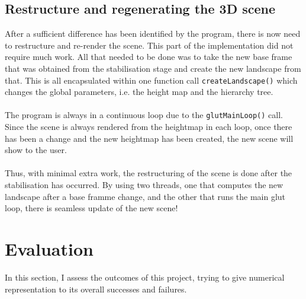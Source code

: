 \documentclass[11pt]{article}
\begin{document}
\subsection{Restructure and regenerating the 3D scene}
After a sufficient difference has been identified by the program, there is
now need to restructure and re-render the scene. This part of
the implementation did not require much work. All that needed to be done was
to take the new base frame that was obtained from the stabilisation
stage and create the new landscape from that. This is all encapsulated 
within one function call \texttt{createLandscape()} which changes
the global parameters, i.e. the height map and the hierarchy tree.\\
\\
The program is always in a continuous loop due to the \texttt{glutMainLoop()}
call. Since the scene is always rendered from the heightmap in each 
loop, once there has been a change and the new heightmap has been created,
the new scene will show to the user.\\
\\
Thus, with minimal extra work, the restructuring of the scene is done
after the stabilisation has occurred. By using two threads, one that
computes the new landscape after a base framme change, and the other
that runs the main glut loop, there is seamless update of the new
scene!

\section{Evaluation}
\label{chapter:evaluation}
In this section, I assess the outcomes of this project, trying to 
give numerical representation to its overall successes and failures.
\end{document}
